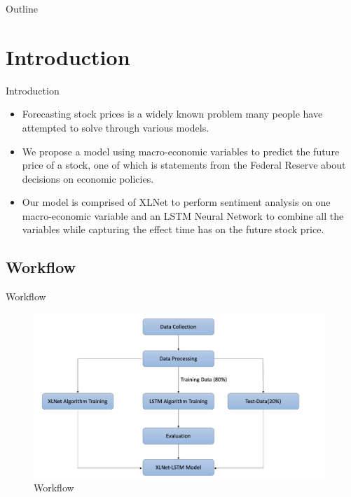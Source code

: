 \documentclass[14pt,aspectratio=169]{beamer}
\author{Blake Hillier, Grace Li, Joe Puhalla}
\title{\TT}
\date{5 May 2020}
\newcommand{\IN}{Introduction}
\newcommand{\WF}{Workflow}
\begin{document}
\begin{frame}
\titlepage
\end{frame}

\begin{frame}{Outline}
    \tableofcontents
\end{frame}

\section{\IN}
\begin{frame}{\IN}
\begin{itemize}
    \item Forecasting stock prices is a widely known problem many people have attempted to solve through various models. \\
    \item We propose a model using macro-economic variables to predict the future price of a stock, one of which is statements from the Federal Reserve about decisions on economic policies.\\
    \item Our model is comprised of XLNet to perform sentiment analysis on one macro-economic variable and an LSTM Neural Network to combine all the variables while capturing the effect time has on the future stock price.
\end{itemize}
\end{frame}

\subsection{\WF}
\begin{frame}{\WF}
\begin{figure}
    \centering
    \includegraphics[width=11cm]{workflow_.png}
    \caption{Workflow}
    \label{fig:my_label}
\end{figure}
\end{frame}
\end{document}
